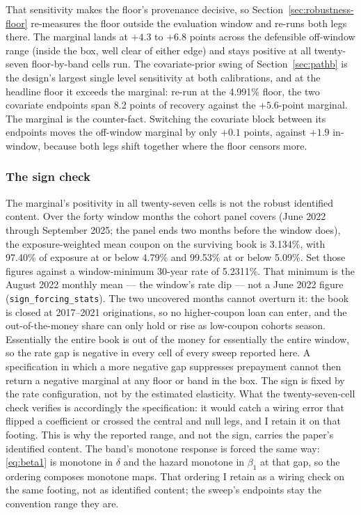 \documentclass[12pt]{article}
\begin{document}
That sensitivity makes the floor's provenance decisive, so Section~\ref{sec:robustness-floor} re-measures the floor outside the evaluation window and re-runs both legs there. The marginal lands at $+4.3$ to $+6.8$ points across the defensible off-window range (inside the box, well clear of either edge) and stays positive at all twenty-seven floor-by-band cells run. The covariate-prior swing of Section~\ref{sec:pathb} is the design's largest single level sensitivity at both calibrations, and at the headline floor it exceeds the marginal: re-run at the 4.991\% floor, the two covariate endpoints span 8.2 points of recovery against the $+5.6$-point marginal. The marginal is the counter-fact. Switching the covariate block between its endpoints moves the off-window marginal by only $+0.1$ points, against $+1.9$ in-window, because both legs shift together where the floor censors more.

\subsubsection{The sign check}

The marginal's positivity in all twenty-seven cells is not the robust identified content. Over the forty window months the cohort panel covers (June 2022 through September 2025; the panel ends two months before the window does), the exposure-weighted mean coupon on the surviving book is 3.134\%, with 97.40\% of exposure at or below 4.79\% and 99.53\% at or below 5.09\%. Set those figures against a window-minimum 30-year rate of 5.2311\%. That minimum is the August 2022 monthly mean --- the window's rate dip --- not a June 2022 figure (\texttt{sign\_forcing\_stats}). The two uncovered months cannot overturn it: the book is closed at 2017--2021 originations, so no higher-coupon loan can enter, and the out-of-the-money share can only hold or rise as low-coupon cohorts season. Essentially the entire book is out of the money for essentially the entire window, so the rate gap is negative in every cell of every sweep reported here. A specification in which a more negative gap suppresses prepayment cannot then return a negative marginal at any floor or band in the box. The sign is fixed by the rate configuration, not by the estimated elasticity. What the twenty-seven-cell check verifies is accordingly the specification: it would catch a wiring error that flipped a coefficient or crossed the central and null legs, and I retain it on that footing. This is why the reported range, and not the sign, carries the paper's identified content. The band's monotone response is forced the same way: \eqref{eq:beta1} is monotone in $\delta$ and the hazard monotone in $\beta_1$ at that gap, so the ordering composes monotone maps. That ordering I retain as a wiring check on the same footing, not as identified content; the sweep's endpoints stay the convention range they are.
\end{document}
